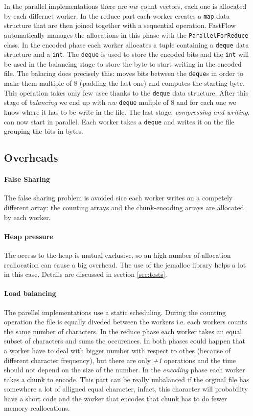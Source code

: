\documentclass[12pt, letterpaper]{article}
\begin{document}
In the parallel implementations there are $nw$ count vectors, each one is allocated by each differnet worker. In the reduce part each worker creates a \texttt{map} data structure that are then joined together with a sequential operation. FastFlow automatically manages the allocations in this phase with the \texttt{ParallelForReduce} class. In the encoded phase each worker allocates a tuple containing a \texttt{deque} data structure and a \texttt{int}. The \texttt{deque} is used to store the encoded bits and the \texttt{int} will be used in the balancing stage to store the byte to start writing in the encoded file. The balacing does precisely this: moves bits between the \texttt{deque}s in order to make them multiple of 8 (padding the last one) and computes the starting byte. This operation takes only few usec thanks to the \texttt{deque} data structure. After this stage of \textit{balancing} we end up with $nw$ \texttt{deque} muliple of 8 and for each one we know where it has to be write in the file. The last stage, \textit{compressing and writing}, can now start in parallel. Each worker takes a \texttt{deque} and writes it on the file grouping the bits in bytes.



\subsection{Overheads}

\paragraph*{False Sharing}
The false sharing problem is avoided sice each worker writes on a competely different array: the counting arrays and the chunk-encoding arrays are allocated by each worker.

\paragraph*{Heap pressure}
The access to the heap is mutual exclusive, so an high number of allocation reallocation can cause a big overhead. The use of the jemalloc library helps a lot in this case. Details are discussed in section \ref{sec:tests}.

\paragraph*{Load balancing}
The parellel implementations use a static scheduling. During the counting operation the file is equally diveded between the workers i.e. each workers counts the same number of characters. In the reduce phase each worker takes an equal subset of characters and sums the occurences. In both phases could happen that a worker have to deal with bigger number with respect to othes (because of different character frequency), but there are only \textit{+1} operations and the time should not depend on the size of the number. In the \textit{encoding} phase each worker takes a chunk to encode. This part can be really unbalanced if the orginal file has somewhere a lot of alligned equal character, infact, this character will probability have a short code and the worker that encodes that chunk has to do fewer memory reallocations.
\end{document}
